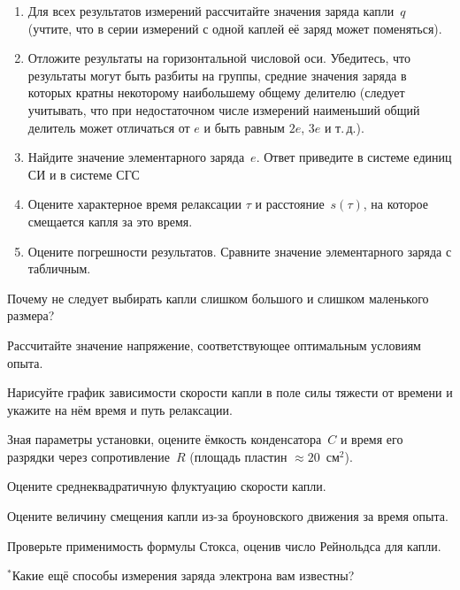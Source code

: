 \begin{lab:task}
\begin{enumerate}

\item Для всех результатов измерений рассчитайте значения заряда капли~$q$
(учтите, что в серии измерений с одной каплей её заряд может поменяться).

\item Отложите результаты на горизонтальной числовой оси. Убедитесь, что
результаты могут быть разбиты на группы, средние значения заряда в которых
кратны некоторому наибольшему общему делителю
(следует учитывать, что при недостаточном числе измерений 
наименьший общий делитель может отличаться от $e$ и быть равным $2e$, $3e$ и т.\,д.).

\item Найдите значение элементарного заряда~$e$. 
Ответ приведите в системе единиц СИ и в системе СГС

\item Оцените характерное время релаксации $\tau$ и расстояние~$s(\tau)$, 
на которое смещается капля за это время.

\item Оцените погрешности результатов. Сравните значение элементарного заряда
с табличным.

\end{enumerate}

\end{lab:task}

\begin{lab:questions}

\item Почему не следует выбирать капли слишком большого и слишком маленького
размера?

\item Рассчитайте значение напряжение, соответствующее оптимальным условиям опыта.

\item Нарисуйте график зависимости скорости капли в поле силы тяжести от времени
и укажите на нём время и путь релаксации.

\item Зная параметры установки, оцените ёмкость конденсатора~$C$ и время его
разрядки через сопротивление~$R$ (площадь пластин $\approx 20$~см$^2$).

\item Оцените среднеквадратичную флуктуацию скорости капли.

\item Оцените величину смещения капли из-за броуновского движения за время опыта.

\item Проверьте применимость формулы Стокса, оценив число Рейнольдса для капли.

\item $^*$Какие ещё способы измерения заряда электрона вам известны?

\end{lab:questions}

